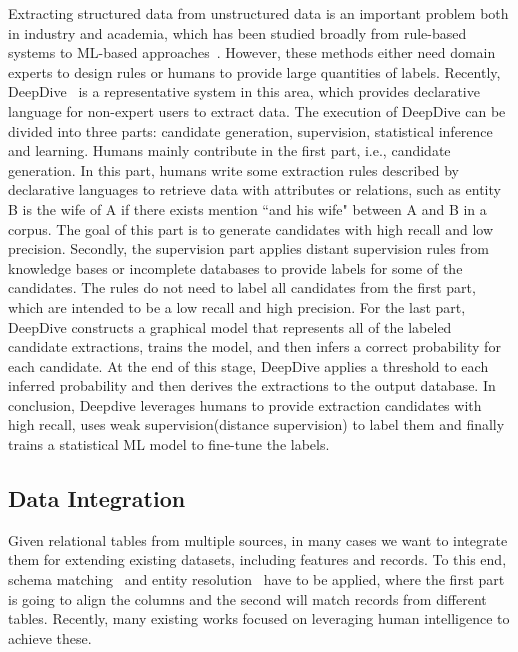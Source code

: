 Extracting structured data from unstructured data is an important problem both in industry and academia, which has been studied broadly from rule-based~\cite{DBLP:conf/acl/LiRC11} systems to ML-based  approaches~\cite{DBLP:conf/wsdm/NakasholeTW11, DBLP:conf/aaai/MitchellCHTBCMG15}. However, these methods either need domain experts to design rules or humans to provide large quantities of labels. Recently, DeepDive~\cite{DBLP:conf/sigmod/Zhang0RCN16} is a representative system in this area, which provides  declarative language  for  non-expert users to extract data.  The execution of DeepDive can be divided into three parts: candidate generation, supervision, statistical inference and learning. Humans mainly contribute in the first part, i.e., candidate generation. In this part, humans write some extraction rules described by declarative languages to retrieve data with attributes or relations, such as  entity B is the wife of A if there exists mention ``and his wife" between A and B in a corpus. The goal of this part is to generate candidates with high recall and low precision. Secondly, the supervision part applies distant supervision rules from knowledge bases or incomplete databases  to provide labels for some of the candidates. The rules do not need to label all candidates from the first part, which are intended to be a low recall and high precision. For the last part, DeepDive constructs a graphical model that represents all of the labeled candidate extractions, trains the model, and then infers a correct probability for each candidate. At the end of this stage, DeepDive applies a threshold to each inferred probability and then derives the extractions to  the output database. In conclusion, Deepdive leverages humans to provide extraction candidates with high recall, uses weak supervision(distance supervision) to label them and finally trains a statistical ML model to fine-tune the labels.
 
 

\subsection{Data Integration}
Given relational tables from multiple sources, in many cases we want to integrate them for extending existing datasets, including features and records. To this end, schema matching~\cite{DBLP:journals/pvldb/ZhangCJC13,DBLP:conf/icde/FanLOTZ14} and entity resolution~\cite{DBLP:crowder, DBLP:transitivity} have to be applied, where the first part is going to align the columns and the second will match records from different tables. Recently, many existing works focused on leveraging human intelligence to achieve these. 

